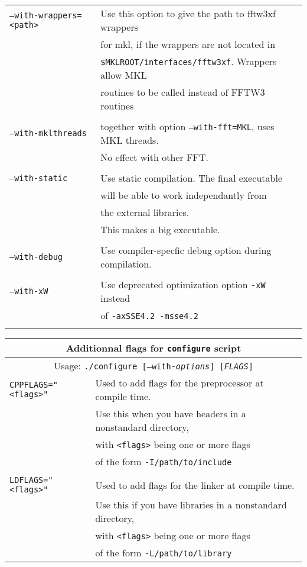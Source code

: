 \documentclass[12pt]{article}
\begin{document}
\begin{center}
\begin{tabular}{ll}
{\tt --with-wrappers=<path>} & Use this option to give the path to fftw3xf wrappers\\
                             & for mkl, if the wrappers are not located in \\
                             & {\tt \$MKLROOT/interfaces/fftw3xf}. Wrappers allow MKL\\
                             &  routines to be called instead of FFTW3 routines\\
\\
{\tt --with-mklthreads} & together with option {\tt --with-fft=MKL}, uses MKL threads. \\
                        & No effect with other FFT.\\
\\
{\tt --with-static} & Use static compilation. The final executable \\
& will be able to work independantly from \\
& the external libraries.\\
& This makes a big executable.\\
\\
{\tt --with-debug} & Use compiler-specfic debug option during compilation. \\
\\
{\tt --with-xW} & Use deprecated optimization option {\tt -xW} instead \\
          & of {\tt-axSSE4.2 -msse4.2}  \\
\\
\hline

\end{tabular}
\end{center}

\newpage

\begin{center}
\begin{tabular}{ll}
\hline
\multicolumn{2}{c}{Additionnal flags for {\tt configure} script}\\
\hline
\multicolumn{2}{c}{Usage: {\tt ./configure [--with-{\it options}] [{\it FLAGS}]} } \\
\hline
{\tt CPPFLAGS="<flags>"} & Used to add flags for the preprocessor at compile time.\\
& Use this when you have headers in a nonstandard directory, \\
& with {\tt <flags>} being one or more flags \\
& of the form {\tt -I/path/to/include} \\
\\
{\tt LDFLAGS="<flags>"} &  Used to add flags for the linker at compile time.\\
& Use this if you have libraries in a nonstandard directory,\\
& with {\tt <flags>} being one or more flags \\
& of the form {\tt -L/path/to/library } \\
\hline
\end{tabular}

\end{center}
\end{document}
